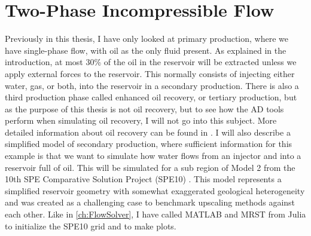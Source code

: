 \section{Two-Phase Incompressible Flow}
\label{sec:TwoPhaseSimulation}
Previously in this thesis, I have only looked at primary production, where we have single-phase flow, with oil as the only fluid present. As explained in the introduction, at most 30\% of the oil in the reservoir will be extracted unless we apply external forces to the reservoir. This normally consists of injecting either water, gas, or both, into the reservoir in a secondary production. There is also a third production phase called enhanced oil recovery, or tertiary production, but as the purpose of this thesis is not oil recovery, but to see how the AD tools perform when simulating oil recovery, I will not go into this subject. More detailed information about oil recovery can be found in \citet{lieMrstUrl}. I will also describe a simplified model of secondary production, where sufficient information for this example is that we want to simulate how water flows from an injector and into a reservoir full of oil. This will be simulated for a sub region of Model 2 from the 10th SPE Comparative Solution Project (SPE10) \citep{SPE10}. This model represents a simplified reservoir geometry with somewhat exaggerated geological heterogeneity and was created as a challenging case to benchmark upscaling methods against each other. Like in \autoref{ch:FlowSolver}, I have called MATLAB and MRST from Julia to initialize the SPE10 grid and to make plots.

